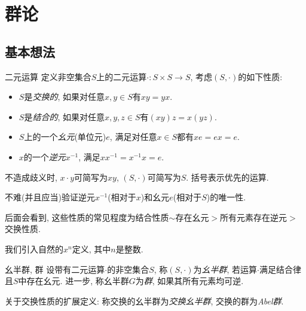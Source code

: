 

\chapter{群论}

\section{基本想法}

\begin{definition}{二元运算}
	定义非空集合$S$上的二元运算$\cdot:S \times S \to S$, 考虑$(S,\cdot )$的如下性质:  
	\begin{itemize}
		\item $S$是\textit{交换的}, 如果对任意$x,y \in S$有$xy = yx$. 
		\item $S$是\textit{结合的}, 如果对任意$x,y,z \in S$有$(xy)z=x(yz)$. 
		\item $S$上的一个\textit{幺元}(单位元)$e$, 满足对任意$x \in S$都有$xe=ex=e$. 
		\item $x$的一个\textit{逆元}$x^{-1}$, 满足$xx^{-1} = x^{-1}x=e$. 
	\end{itemize}
\end{definition}
\begin{remark}
	不造成歧义时, $x\cdot y$可简写为$xy$, $(S,\cdot)$可简写为$S$. 括号表示优先的运算. 
\end{remark}
\begin{remark}
	不难(并且应当)验证逆元$x^{-1}$(相对于$x$)和幺元$e$(相对于$S$)的唯一性. 
\end{remark}
\begin{remark}
	后面会看到, 这些性质的常见程度为结合性质$\sim$存在幺元$>$所有元素存在逆元$>$交换性质. 
\end{remark}

我们引入自然的$x^n$定义, 其中$n$是整数. 

\begin{definition}{幺半群, 群}
	设带有二元运算$\cdot$的非空集合$S$, 称$(S,\cdot)$为\textit{幺半群}, 若运算$\cdot$满足结合律且$S$中存在幺元. 进一步, 称幺半群$G$为\textit{群}, 如果其所有元素均可逆. 
\end{definition}
\begin{remark}
	关于交换性质的扩展定义: 称交换的幺半群为\textit{交换幺半群}, 交换的群为\textit{Abel群}. 
\end{remark}

